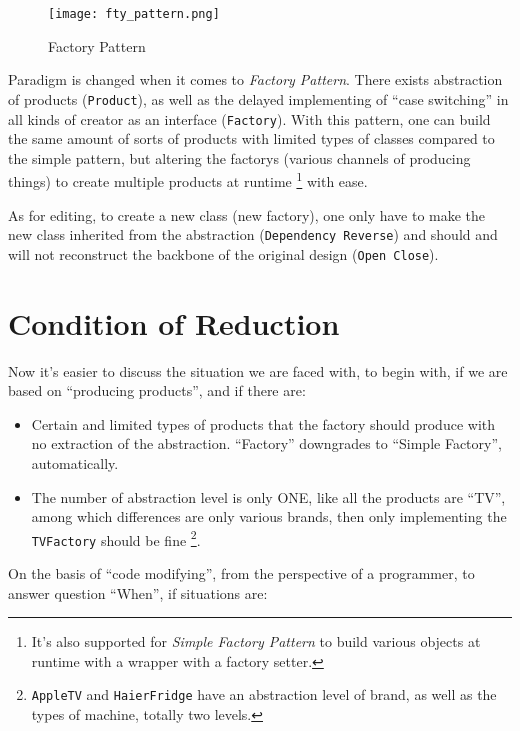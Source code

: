 \documentclass[a4paper]{article}
\begin{document}
\begin{figure}[h]
\begin{center}
\texttt{[image: fty\_pattern.png]}
\end{center}
\caption{Factory Pattern}
\label{fty}
\end{figure}

Paradigm is changed when it comes to \textit{Factory Pattern}. There exists abstraction of products (\texttt{Product}),
as well as the delayed implementing of ``case switching'' in all kinds of creator as an interface (\texttt{Factory}).
With this pattern, one can build the same amount of sorts of products with limited types of classes compared
to the simple pattern, but altering the factorys (various channels of producing things) to create
multiple products at runtime
\footnote{It's also supported for \textit{Simple Factory Pattern} to build various objects at runtime  with a wrapper with a factory setter.} with ease.

As for editing, to create a new class (new factory), one only have to
make the new class inherited from the abstraction (\texttt{Dependency Reverse}) and
should and will not reconstruct the backbone of the original design (\texttt{Open Close}).

\section{Condition of Reduction} \label{condition}

Now it's easier to discuss the situation we are faced with, to begin with,
if we are based on ``producing products'', and if there are:

\begin{itemize}
    \item Certain and limited types of products that the factory should
        produce with no extraction of the abstraction.
        ``Factory'' downgrades to ``Simple Factory'', automatically.
    \item The number of abstraction level is only ONE, like all the products are ``TV'', among which differences are only various brands,
        then only implementing the \texttt{TVFactory} should be fine
        \footnote{\texttt{AppleTV} and \texttt{HaierFridge} have an abstraction level of brand,
        as well as the types of machine, totally two levels.}.
\end{itemize}

On the basis of ``code modifying'', from the perspective of a programmer, to answer question ``When'', if situations are:
\end{document}
